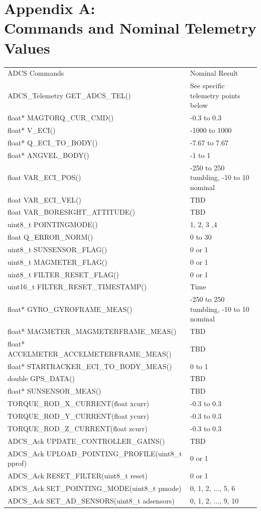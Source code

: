 \documentclass{article}
\begin{document}
\newpage
\section{Appendix A: \\ Commands and Nominal Telemetry Values}

\begin{tabular}{|l|l|}
	\hline
	ADCS Commands      &  Nominal Result                \\ \hhline{|=|=|}
	ADCS_Telemetry GET_ADCS_TEL() & See specific telemetry points below \\ \hline
	float* MAGTORQ_CUR_CMD() & -0.3 to 0.3 \\ \hline
	float* V_ECI() & -1000 to 1000 \\ \hline
	float* Q_ECI_TO_BODY() & -7.67 to 7.67 \\ \hline
	float* ANGVEL_BODY() & -1 to 1 \\ \hline
	float VAR_ECI_POS() & -250 to 250 tumbling, -10 to 10 nominal \\ \hline
	float VAR_ECI_VEL() & TBD \\ \hline
	float VAR_BORESIGHT_ATTITUDE() & TBD \\ \hline
	uint8_t POINTINGMODE() & 1, 2, 3 ,4 \\ \hline
	float Q_ERROR_NORM() & 0 to 30 \\ \hline
	uint8_t SUNSENSOR_FLAG() & 0 or 1 \\ \hline
	uint8_t MAGMETER_FLAG() & 0 or 1  \\ \hline
	uint8_t FILTER_RESET_FLAG() & 0 or 1 \\ \hline
	uint16_t FILTER_RESET_TIMESTAMP() & Time \\ \hline
	float* GYRO_GYROFRAME_MEAS() & -250 to 250 tumbling, -10 to 10 nominal \\ \hline
	float* MAGMETER_MAGMETERFRAME_MEAS() & TBD \\ \hline
	float* ACCELMETER_ACCELMETERFRAME_MEAS() & TBD \\ \hline
	float* STARTRACKER_ECI_TO_BODY_MEAS() & 0 to 1 \\ \hline
	double GPS_DATA() & TBD \\ \hline
	float* SUNSENSOR_MEAS() & TBD \\ \hline
	TORQUE_ROD_X_CURRENT(float xcurr) & -0.3 to 0.3 \\ \hline
	TORQUE_ROD_Y_CURRENT(float ycurr) & -0.3 to 0.3 \\ \hline
	TORQUE_ROD_Z_CURRENT(float zcurr)  & -0.3 to 0.3 \\ \hline
	ADCS_Ack UPDATE_CONTROLLER_GAINS() & TBD \\ \hline
	ADCS_Ack UPLOAD_POINTING_PROFILE(uint8_t pprof) & 0 or 1 \\ \hline
	ADCS_Ack RESET_FILTER(uint8_t reset) & 0 or 1 \\ \hline
	ADCS_Ack SET_POINTING_MODE(uint8_t pmode) & 0, 1, 2, $\dots$, 5, 6 \\ \hline
	ADCS_Ack SET_AD_SENSORS(uint8_t adsensors) & 0, 1, 2, $\dots$, 9, 10 \\ \hline
\end{tabular}
\end{document}
